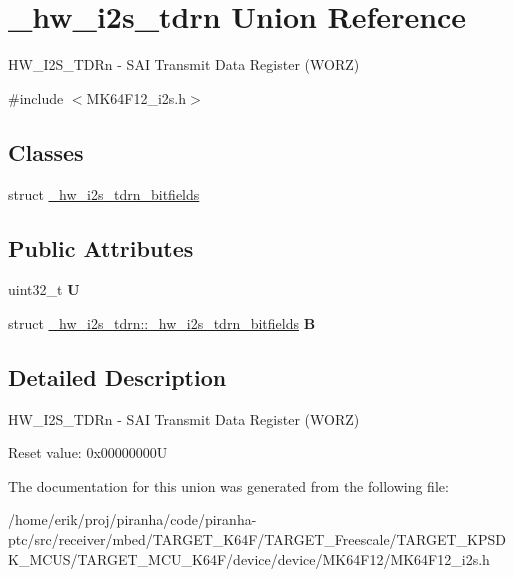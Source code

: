 \hypertarget{union__hw__i2s__tdrn}{}\section{\+\_\+hw\+\_\+i2s\+\_\+tdrn Union Reference}
\label{union__hw__i2s__tdrn}


H\+W\+\_\+\+I2\+S\+\_\+\+T\+D\+Rn -\/ S\+AI Transmit Data Register (W\+O\+RZ)  




{\ttfamily \#include $<$M\+K64\+F12\+\_\+i2s.\+h$>$}

\subsection*{Classes}
\begin{DoxyCompactItemize}
\item 
struct \hyperlink{struct__hw__i2s__tdrn_1_1__hw__i2s__tdrn__bitfields}{\+\_\+hw\+\_\+i2s\+\_\+tdrn\+\_\+bitfields}
\end{DoxyCompactItemize}
\subsection*{Public Attributes}
\begin{DoxyCompactItemize}
\item 
uint32\+\_\+t {\bfseries U}\hypertarget{union__hw__i2s__tdrn_a1269126899f4d46a0144bdf78bcff229}{}\label{union__hw__i2s__tdrn_a1269126899f4d46a0144bdf78bcff229}

\item 
struct \hyperlink{struct__hw__i2s__tdrn_1_1__hw__i2s__tdrn__bitfields}{\+\_\+hw\+\_\+i2s\+\_\+tdrn\+::\+\_\+hw\+\_\+i2s\+\_\+tdrn\+\_\+bitfields} {\bfseries B}\hypertarget{union__hw__i2s__tdrn_a85869f7693ccb83d91851524f9adbb5b}{}\label{union__hw__i2s__tdrn_a85869f7693ccb83d91851524f9adbb5b}

\end{DoxyCompactItemize}


\subsection{Detailed Description}
H\+W\+\_\+\+I2\+S\+\_\+\+T\+D\+Rn -\/ S\+AI Transmit Data Register (W\+O\+RZ) 

Reset value\+: 0x00000000U 

The documentation for this union was generated from the following file\+:\begin{DoxyCompactItemize}
\item 
/home/erik/proj/piranha/code/piranha-\/ptc/src/receiver/mbed/\+T\+A\+R\+G\+E\+T\+\_\+\+K64\+F/\+T\+A\+R\+G\+E\+T\+\_\+\+Freescale/\+T\+A\+R\+G\+E\+T\+\_\+\+K\+P\+S\+D\+K\+\_\+\+M\+C\+U\+S/\+T\+A\+R\+G\+E\+T\+\_\+\+M\+C\+U\+\_\+\+K64\+F/device/device/\+M\+K64\+F12/M\+K64\+F12\+\_\+i2s.\+h\end{DoxyCompactItemize}
